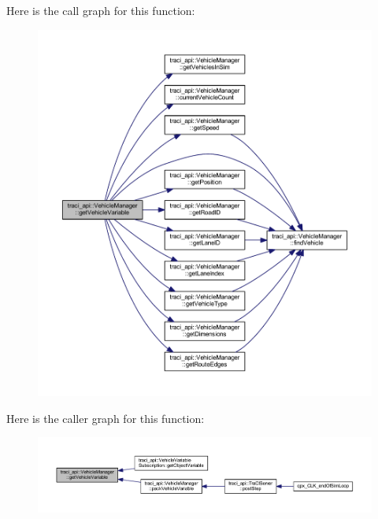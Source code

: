 Here is the call graph for this function\+:
\nopagebreak
\begin{figure}[H]
\begin{center}
\leavevmode
\includegraphics[width=350pt]{classtraci__api_1_1_vehicle_manager_a6926963a4f6914be50a1b75833574249_cgraph}
\end{center}
\end{figure}
Here is the caller graph for this function\+:
\nopagebreak
\begin{figure}[H]
\begin{center}
\leavevmode
\includegraphics[width=350pt]{classtraci__api_1_1_vehicle_manager_a6926963a4f6914be50a1b75833574249_icgraph}
\end{center}
\end{figure}
\mbox{\label{classtraci__api_1_1_vehicle_manager_af404c1fa8e1459cbf415d1f4931c3ad6}} 
